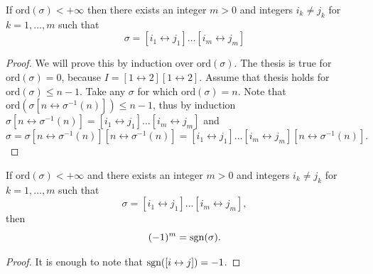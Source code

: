 \documentclass[main.tex]{subfiles}
\begin{document}
\begin{theorem}
If $\text{ord}(\sigma) < +\infty$ then there exists an integer $m > 0$ and integers $i_k\not=j_k$ for $k=1, \dots, m$ such that
\begin{equation}
\sigma = [i_1\leftrightarrow j_1] \dots [i_m\leftrightarrow j_m]
\end{equation}
\end{theorem}
\begin{proof}
We will prove this by induction over $\text{ord}(\sigma)$. The thesis is true for $\text{ord}(\sigma)=0$, because $I = [1 \leftrightarrow 2][1 \leftrightarrow 2]$. Assume that thesis holds for $\text{ord}(\sigma) \leq n - 1$. Take any $\sigma$ for which $\text{ord}(\sigma) = n$. Note that $\text{ord}(\sigma[n\leftrightarrow \sigma^{-1}(n)]) \leq n-1$, thus by induction $\sigma[n\leftrightarrow \sigma^{-1}(n)] = [i_1\leftrightarrow j_1] \dots [i_m\leftrightarrow j_m]$ and
\begin{equation}
\sigma = \sigma[n\leftrightarrow \sigma^{-1}(n)][n\leftrightarrow \sigma^{-1}(n)] 
= [i_1\leftrightarrow j_1] \dots [i_m\leftrightarrow j_m][n\leftrightarrow \sigma^{-1}(n)].
\end{equation}
\end{proof}

\begin{theorem}
If $\text{ord}(\sigma) < +\infty$ and there exists an integer $m > 0$ and integers $i_k\not=j_k$ for $k=1, \dots, m$ such that
\begin{equation}
\sigma = [i_1\leftrightarrow j_1] \dots [i_m\leftrightarrow j_m],
\end{equation}
then 
\begin{equation}
(-1)^m = \text{sgn}(\sigma).
\end{equation}
\end{theorem}
\begin{proof}
It is enough to note that $\text{sgn}([i\leftrightarrow j]) = -1$.
\end{proof}
\end{document}
